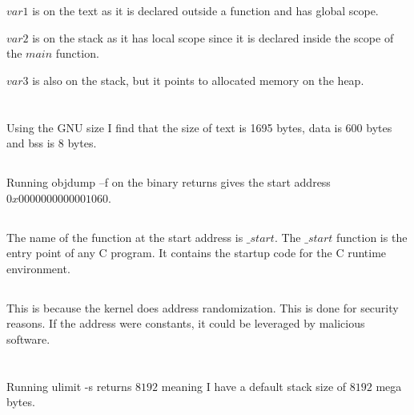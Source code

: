 \documentclass{article}
\begin{document}
$var1$ is on the text as it is declared outside a function and has global scope. 

$var2$ is on the stack as it has local scope since it is declared inside the scope of the $main$ function. 

$var3$ is also on the stack, but it points to allocated memory on the heap.

\section{}
\subsection{}
Using the GNU size I find that the size of text is 1695 bytes, data is 600 bytes and bss is 8 bytes. 

\subsection{}
Running objdump –f on the binary returns gives the start address $0x0000000000001060$.

\subsection{}
The name of the function at the start address is $\_start$. The $\_start$ function is the entry point of any C program. It contains the startup code for the C runtime environment. 

\subsection{}
This is because the kernel does address randomization. This is done for security reasons. If the address were constants, it could be leveraged by malicious software. 

\section{}
\subsection{}

\subsection{}
Running ulimit -s returns $8192$ meaning I have a default stack size of $8192$ mega bytes.
\end{document}

